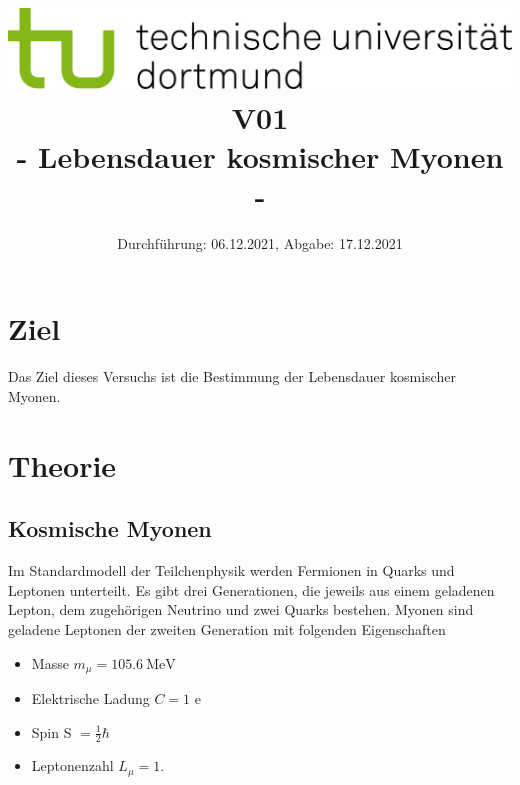 
\usepackage{romannum}
\usepackage{listings}
\lstset{numbers=left, numberstyle=\tiny, numbersep=5pt}
\lstset{language=Perl}

\title{\includegraphics[scale=0.8]{../logo.jpg} \\ \vspace*{1cm} V01 \\ - Lebensdauer kosmischer Myonen -}

\date{Durchführung: 06.12.2021, Abgabe: 17.12.2021}



\maketitle

\tableofcontents
\newpage

\section{Ziel}
Das Ziel dieses Versuchs ist die Bestimmung der Lebensdauer kosmischer Myonen.

\section{Theorie}

\subsection{Kosmische Myonen}
Im Standardmodell der Teilchenphysik werden Fermionen in Quarks und Leptonen unterteilt. 
Es gibt drei Generationen, die jeweils aus einem geladenen Lepton, dem zugehörigen Neutrino und zwei Quarks bestehen. Myonen sind geladene Leptonen der zweiten Generation mit folgenden Eigenschaften
\begin{itemize}
    \item Masse $ m_{\mu} = \SI{105.6}{\mega\electronvolt}$
    \item Elektrische Ladung $C = 1$ e
    \item Spin S $= \frac{1}{2} \hbar$
    \item Leptonenzahl $L_{\mu} = 1$.
\end{itemize}

